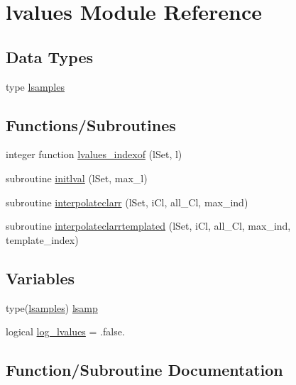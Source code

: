 \hypertarget{namespacelvalues}{}\section{lvalues Module Reference}
\label{namespacelvalues}
\subsection*{Data Types}
\begin{DoxyCompactItemize}
\item 
type \mbox{\hyperlink{structlvalues_1_1lsamples}{lsamples}}
\end{DoxyCompactItemize}
\subsection*{Functions/\+Subroutines}
\begin{DoxyCompactItemize}
\item 
integer function \mbox{\hyperlink{namespacelvalues_ae29d1934474229125b75e4a609f4e81e}{lvalues\+\_\+indexof}} (l\+Set, l)
\item 
subroutine \mbox{\hyperlink{namespacelvalues_aae4ab5512d16abd3d2f2857fe806e012}{initlval}} (l\+Set, max\+\_\+l)
\item 
subroutine \mbox{\hyperlink{namespacelvalues_a62105cb97d67654d96481cbb8fe54240}{interpolateclarr}} (l\+Set, i\+Cl, all\+\_\+\+Cl, max\+\_\+ind)
\item 
subroutine \mbox{\hyperlink{namespacelvalues_a0aa80e0b1f26674e19df96ec0d9c199e}{interpolateclarrtemplated}} (l\+Set, i\+Cl, all\+\_\+\+Cl, max\+\_\+ind, template\+\_\+index)
\end{DoxyCompactItemize}
\subsection*{Variables}
\begin{DoxyCompactItemize}
\item 
type(\mbox{\hyperlink{structlvalues_1_1lsamples}{lsamples}}) \mbox{\hyperlink{namespacelvalues_ae00efa8263b3dcff6d82e34d4102a808}{lsamp}}
\item 
logical \mbox{\hyperlink{namespacelvalues_afe164d781a115f4ab472604a3b522c6d}{log\+\_\+lvalues}} = .false.
\end{DoxyCompactItemize}


\subsection{Function/\+Subroutine Documentation}
\mbox{\label{namespacelvalues_aae4ab5512d16abd3d2f2857fe806e012}} 

